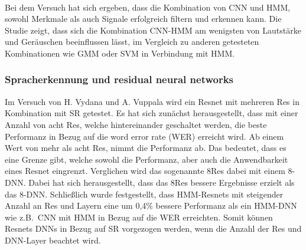 \\
Bei dem Versuch hat sich ergeben, dass die Kombination von CNN und HMM, sowohl Merkmale als auch Signale erfolgreich filtern und erkennen kann. Die Studie zeigt, dass sich die Kombination CNN-HMM am wenigsten von Lautstärke und Geräuschen beeinflussen lässt, im Vergleich zu anderen getesteten Kombinationen wie GMM \cite{svmgmm} oder SVM \cite{svmgmm} in Verbindung mit HMM.

\subsubsection{Spracherkennung und residual neural networks}
Im Versuch von H. Vydana und A. Vuppala \cite{residualnn} wird ein Resnet mit mehreren Res in Kombination mit SR getestet. Es hat sich zunächst herausgestellt, dass mit einer Anzahl von acht Res, welche hintereinander geschaltet werden, die beste Performanz in Bezug auf die word error rate (WER) erreicht wird. Ab einem Wert von mehr als acht Res, nimmt die Performanz ab. Das bedeutet, dass es eine Grenze gibt, welche sowohl die Performanz, aber auch die Anwendbarkeit eines Resnet eingrenzt. Verglichen wird das sogenannte 8Res dabei mit einem 8-DNN. Dabei hat sich herausgestellt, dass das 8Res bessere Ergebnisse erzielt als das 8-DNN. Schließlich wurde festgestellt, dass HMM-Resnets mit steigender Anzahl an Res und Layern eine um 0,4\% bessere Performanz als ein HMM-DNN \cite{residualnn} wie z.B.~CNN mit HMM in Bezug auf die WER erreichten. Somit können Resnets DNNs in Bezug auf SR vorgezogen werden, wenn die Anzahl der Res und DNN-Layer beachtet wird.


